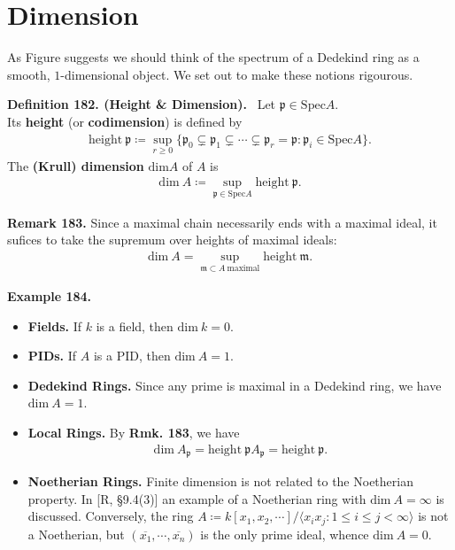 \documentclass[12pt,a4paper,footinclude=true,headinclude=true]{scrbook} %
\newenvironment{definition}[2][Definition]
    { \begin{mdframed}[backgroundcolor=gray!20] \textbf{#1 #2.}\ }
    {  \end{mdframed}}
\newenvironment{remark}[2][Remark]
    { \begin{mdframed}[backgroundcolor=gray!20] \textbf{#1 #2.} }
    {  \end{mdframed}}
\newenvironment{example}[2][Example]
    { \begin{mdframed}[backgroundcolor=gray!20] \textbf{#1 #2.} }
    {  \end{mdframed}}
\begin{document}
\newpage

\section{Dimension}
As Figure suggests we should think of the spectrum of a Dedekind ring as a smooth, $1$-dimensional object. We set out to make these notions rigourous.
\begin{definition}{182. (Height \& Dimension)}
    Let $\mathfrak{p}\in\mathrm{Spec}A$. \\ Its \textbf{height} (or \textbf{codimension}) is defined by
    \begin{align*}
        \mathrm{height}\ \mathfrak{p}\coloneqq\sup\limits_{r\geq0} \{\mathfrak{p}_0\subsetneq\mathfrak{p}_1\subsetneq\cdots\subsetneq\mathfrak{p}_r=\mathfrak{p}:\mathfrak{p}_i\in\mathrm{Spec}A\}.
    \end{align*}
    The \textbf{(Krull) dimension} $\mathrm{dim}A$ of $A$ is 
    \begin{align*}
        \mathrm{dim}\ A\coloneqq\sup\limits_{\mathfrak{p}\in\mathrm{Spec}A}\mathrm{height}\ \mathfrak{p}.
    \end{align*}
\end{definition}

\begin{remark}{183}
    Since a maximal chain necessarily ends with a maximal ideal, it sufices to take the supremum over heights of maximal ideals:
    \begin{align*}
        \mathrm{dim}\ A=\sup\limits_{\mathfrak{m}\subset A\ \text{maximal}}\mathrm{height}\ \mathfrak{m}.
    \end{align*}
\end{remark}

\begin{example}{184}
    \begin{itemize}
        \item \textbf{Fields.} If $k$ is a field, then $\mathrm{dim}\ k=0$.
        \item \textbf{PIDs.} If $A$ is a PID, then $\mathrm{dim}\ A=1$.
        \item \textbf{Dedekind Rings.} Since any prime is maximal in a Dedekind ring, we have $\mathrm{dim}\ A=1$.
        \item \textbf{Local Rings.} By \textbf{Rmk. 183}, we have
        \begin{align*}
            \mathrm{dim}\ A_\mathfrak{p}=\mathrm{height}\ \mathfrak{p}A_\mathfrak{p}=\mathrm{height}\ \mathfrak{p}.
        \end{align*}
        \item \textbf{Noetherian Rings.} Finite dimension is not related to the Noetherian property. In [R, \S9.4(3)] an example of a Noetherian ring with $\mathrm{dim}\ A=\infty$ is discussed. Conversely, the ring $A\coloneqq k[x_1,x_2,\cdots]/\langle x_ix_j:1\leq i\leq j<\infty\rangle$ is not a Noetherian, but $(\overline{x_1},\cdots,\overline{x_n})$ is the only prime ideal, whence $\mathrm{dim}\ A=0$. 
    \end{itemize}
\end{example}
\end{document}
